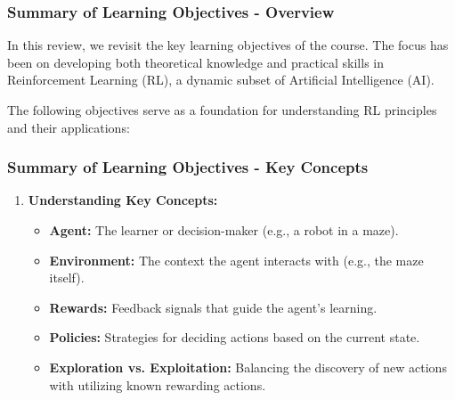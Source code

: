 \documentclass{beamer}
\begin{document}
\begin{frame}[fragile]
    \frametitle{Summary of Learning Objectives - Overview}
    In this review, we revisit the key learning objectives of the course. The focus has been on developing both theoretical knowledge and practical skills in Reinforcement Learning (RL), a dynamic subset of Artificial Intelligence (AI).
    
    The following objectives serve as a foundation for understanding RL principles and their applications:
\end{frame}

\begin{frame}[fragile]
    \frametitle{Summary of Learning Objectives - Key Concepts}
    \begin{enumerate}
        \item \textbf{Understanding Key Concepts:}
        \begin{itemize}
            \item \textbf{Agent:} The learner or decision-maker (e.g., a robot in a maze).
            \item \textbf{Environment:} The context the agent interacts with (e.g., the maze itself).
            \item \textbf{Rewards:} Feedback signals that guide the agent's learning.
            \item \textbf{Policies:} Strategies for deciding actions based on the current state.
            \item \textbf{Exploration vs. Exploitation:} Balancing the discovery of new actions with utilizing known rewarding actions.
        \end{itemize}
    \end{enumerate}
\end{frame}
\end{document}
